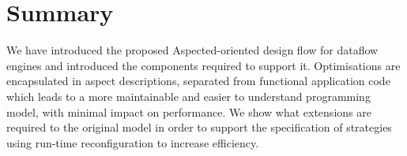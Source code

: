 \section{Summary}

We have introduced the proposed Aspected-oriented design flow for
dataflow engines and introduced the components required to support
it. Optimisations are encapsulated in aspect descriptions, separated
from functional application code which leads to a more maintainable
and easier to understand programming model, with minimal impact on
performance. We show what extensions are required to the original
model in order to support the specification of strategies using
run-time reconfiguration to increase efficiency.
